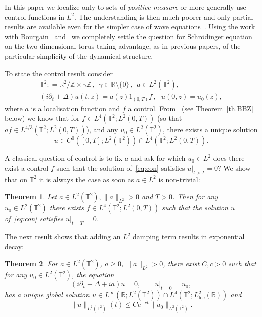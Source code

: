 \documentclass[11pt]{article}
\newtheorem{theo}{Theorem}[section]
\theoremstyle{definition}
\numberwithin{equation}{section}
\numberwithin{figure}{section}
\numberwithin{table}{section}
\newcommand{\R}{{\mathbb R}}
\newcommand{\TT}{{\mathbb T}}
\newcommand{\ZZ}{{\mathbb Z}}
\newcommand{\loc}{\mathrm{loc}}
\begin{document}
In this paper we localize only to sets of \emph{positive measure} or more generally use control functions in $ L^2 $. The understanding is then much poorer and only partial results are available even for the simpler case of wave equations~\cite{Bu16,Bu17}. Using the work with Bourgain~\cite{BBZ} and~\cite{BZ4} we completely settle the question for Schrödinger equation on the two dimensional torus taking advantage, as in previous papers, of the particular simplicity of the dynamical structure.


To state the control result consider
\begin{equation}\label{eq:con}
\begin{gathered} \TT^2 : = \R^2 / \ZZ \times \gamma \ZZ \,, \ \ \gamma \in \R \setminus \{
0 \}\,, \ \ a \in L^2 (\TT^2), \\
(i \partial_t + \Delta) u (t, z) = a(z) 1_{(0,T)}f \,, \ \ \ u (0, z) =u_0 (z),
\end{gathered}
\end{equation}
where $a $ is a localisation function and $f$ a control. From~\cite[Proposition~2.2]{BBZ} (see Theorem~\ref{th.BBZ} below) we know that for $f \in L^{4}(\TT^2 ; L^2(0,T))$ (so that $af \in L^{4/3}(\TT^2 ; L^2(0,T))$), and any $u_0 \in L^2(\TT^2)$, there exists a unique solution
\[
u \in C^0 ([0,T]; L^2(\TT^2)) \cap L^4 (\TT^2; L^2(0,T)).
\]

A classical question of control is to fix $ a $ and ask for which $u_0 \in L^2$ does there exist a control $f$ such that the solution of~\eqref{eq:con} satisfies $u |_{t>T} =0$? We show that on $\mathbb{T}^2$ it is always the case as soon as $a \in L^2$ is non-trivial:

\begin{theo}\label{th.2}
Let $a \in L^2(\TT^2), \| a \|_{L^2} >0$ and $ T > 0 $. Then for any $u_0\in L^2(\TT^2)$ there exists $f \in L^4(\TT^2 ; L^2(0,T))$ such that the solution $u$ of~\eqref{eq:con} satisfies $u |_{t=T} =0$.
\end{theo}

The next result shows that adding an $ L^2 $ damping term results in exponential decay:

\begin{theo}\label{th.3}
For $a\in L^2(\TT^2)$, $ a \geq 0 $, $ \| a \|_{L^2} > 0$, there exist $C, c>0$ such that for any $u_0 \in L^2(\TT^2)$, the equation
\begin{equation}\label{damped}
(i \partial_t + \Delta + ia) u=0, \qquad u |_{t=0} = u_0,
\end{equation}
has a unique global solution $ u \in L^\infty(\R; L^2(\TT^2))\cap L^4(\TT^2; L^2_{\loc}(\R)) $ and
\begin{equation}\label{dampedbis}
\| u\|_{L^2(\TT^2)} (t) \leq C e^{-ct} \| u_0 \|_{L^2(\TT^2)}.
\end{equation}
\end{theo}
\end{document}
